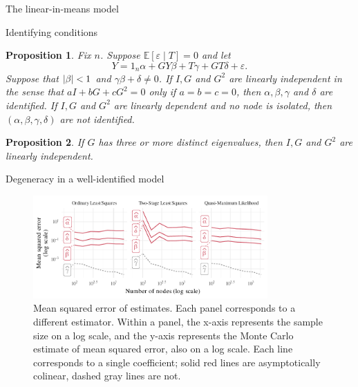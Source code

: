 \documentclass[final]{beamer}
\newtheorem{proposition}{Proposition}
\newlength{\colwidth}
\begin{document}
\begin{frame}[t]
\begin{columns}[t]
\begin{column}{\colwidth}
\begin{block}{The linear-in-means model}
            \end{block}

            \begin{block}{Identifying conditions}

                \begin{proposition}
                    \label{prop:bramoulle2009}
                    Fix $n$. Suppose $\mathbb E[\varepsilon \mid T] = 0$ and let
                    \begin{equation*}
                        Y = 1_n \alpha + G Y \beta + T \gamma + G T \delta + \varepsilon.
                    \end{equation*}
                    Suppose that $\lvert\beta\rvert < 1$ and $\gamma \beta + \delta \neq 0$.
                    If $I, G$ and $G^2$ are linearly independent in the sense that $a I + b G + c G^2 = 0$ only if $a = b = c = 0$, then $\alpha, \beta, \gamma$ and $\delta$ are identified.
                    If $I, G$ and $G^2$ are linearly dependent and no node is isolated, then $(\alpha, \beta, \gamma, \delta)$ are not identified.
                \end{proposition}

                \begin{proposition} \label{prop:three-eig}
                    If $G$ has three or more distinct eigenvalues, then $I, G$ and $G^2$ are linearly independent.
                \end{proposition}

            \end{block}


            \begin{block}{Degeneracy in a well-identified model}

                \begin{figure}
                    \centering
                    \includegraphics[width=0.8\textwidth]{./figures/simulations/biometrika-mse.pdf}
                    \caption{Mean squared error of estimates. Each panel corresponds to a different estimator. Within a panel, the x-axis represents the sample size on a log scale, and the y-axis represents the Monte Carlo estimate of mean squared error, also on a log scale. Each line corresponds to a single coefficient; solid red lines are asymptotically colinear, dashed gray lines are not.}
                    \label{fig:mse-problem}
                \end{figure}
            \end{block}
        \end{column}


\end{columns}
\end{frame}
\end{document}
